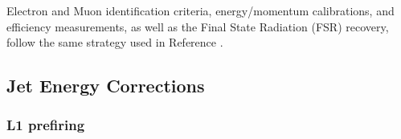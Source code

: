 Electron and Muon identification criteria, energy/momentum calibrations, and efficiency measurements,
as well as the Final State Radiation (FSR) recovery, follow the same strategy used in Reference \cite{CMS-SMP-20-001}. %

\subsection{Jet Energy Corrections}


\subsubsection{L1 prefiring}

